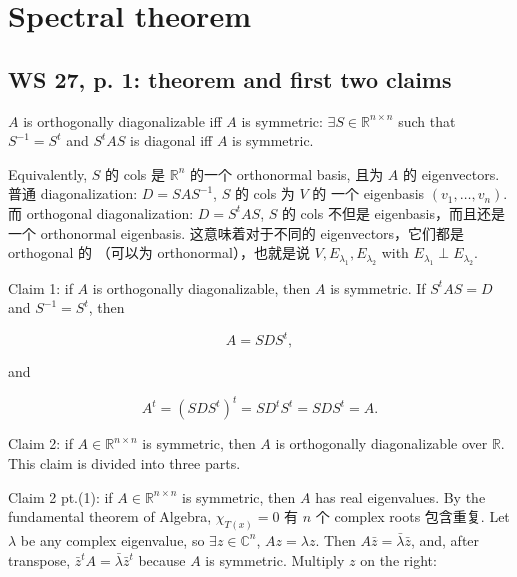\chapter{Spectral theorem}

\section{WS 27, p. 1: theorem and first two claims}

\begin{theorem}{}

\(A\) is orthogonally diagonalizable iff \(A\) is symmetric: \(\exists S \in \mathbb{R}^{n \times n}\) such that \(S^{- 1} = S^{t}\) and \(S^{t}AS\) is diagonal iff \(A\) is symmetric.

\end{theorem}

Equivalently, \(S\) 的 cols 是 \(\mathbb{R}^{n}\) 的一个 orthonormal basis, 且为 \(A\) 的 eigenvectors. 普通 diagonalization: \(D = SAS^{- 1}\), \(S\) 的 cols 为 \(V\) 的 一个 eigenbasis \(\left( {v_{1},\ldots,v_{n}} \right)\). 而 orthogonal diagonalization: \(D = S^{t}AS\), \(S\) 的 cols 不但是 eigenbasis，而且还是一个 orthonormal eigenbasis. 这意味着对于不同的 eigenvectors，它们都是 orthogonal 的 （可以为 orthonormal），也就是说 \(V,E_{\lambda_{1}},E_{\lambda_{2}}\) with \(E_{\lambda_{1}} \perp E_{\lambda_{2}}\).

Claim 1: if \(A\) is orthogonally diagonalizable, then \(A\) is symmetric. If \(S^{t}AS = D\) and \(S^{- 1} = S^{t}\), then

\[A = SDS^{t},\]

and

\[A^{t} = \left( {SDS^{t}} \right)^{t} = SD^{t}S^{t} = SDS^{t} = A.\]

Claim 2: if \(A \in \mathbb{R}^{n \times n}\) is symmetric, then \(A\) is orthogonally diagonalizable over \(\mathbb{R}\). This claim is divided into three parts.

Claim 2 pt.(1): if \(A \in \mathbb{R}^{n \times n}\) is symmetric, then \(A\) has real eigenvalues. By the fundamental theorem of Algebra, \(\chi_{T{(x)}} = 0\) 有 \(n\) 个 complex roots 包含重复. Let \(\lambda\) be any complex eigenvalue, so \(\exists z \in \mathbb{C}^{n}\), \(Az = \lambda z\). Then \(A\bar{z} = \bar{\lambda}\bar{z}\), and, after transpose, \({\bar{z}}^{t}A = \bar{\lambda}{\bar{z}}^{t}\) because \(A\) is symmetric. Multiply \(z\) on the right:

